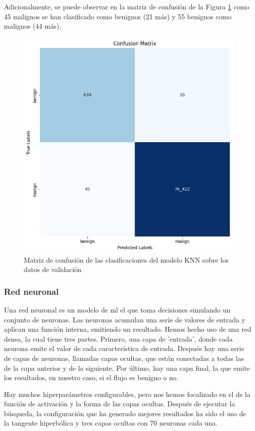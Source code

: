 Adicionalmente, se puede observar en la matriz de confusión de la Figura \ref{fig:knnmatrix} como 45 malignos se han clasificado como benignos (21 más) y 55 benignos como malignos (44 más).

\begin{figure}[H]
    \begin{center}
        \includegraphics[width=0.62\linewidth]{media/packet_pincer_train_models_KNN.png}
    \end{center}
    \caption{Matriz de confusión de las clasificaciones del modelo KNN sobre los datos de validación}\label{fig:knnmatrix}
\end{figure}

\subsubsection{Red neuronal}

Una red neuronal es un modelo de \gls{ml} el que toma decisiones simulando un conjunto de neuronas. Las neuronas acumulan una serie de valores de entrada y aplican una función interna, emitiendo un resultado. Hemos hecho uso de una red densa, la cual tiene tres partes. Primero, una capa de 'entrada', donde cada neurona emite el valor de cada característica de entrada. Después hay una serie de capas de neuronas, llamadas capas ocultas, que están conectadas a todas las de la capa anterior y de la siguiente. Por último, hay una capa final, la que emite los resultados, en nuestro caso, si el flujo es benigno o no.

Hay muchos hiperparámetros configurables, pero nos hemos focalizado en el de la función de activación y la forma de las capas ocultas. Después de ejecutar la búsqueda, la configuración que ha generado mejores resultados ha sido el uso de la tangente hiperbólica y tres capas ocultas con 70 neuronas cada una.

